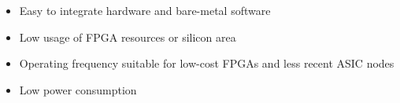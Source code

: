 %

\begin{itemize}
  \itemsep-0.5em
\item Easy to integrate hardware and bare-metal software
\item Low usage of FPGA resources or silicon area 
\item Operating frequency suitable for low-cost FPGAs and less recent ASIC nodes
\item Low power consumption
\end{itemize}
